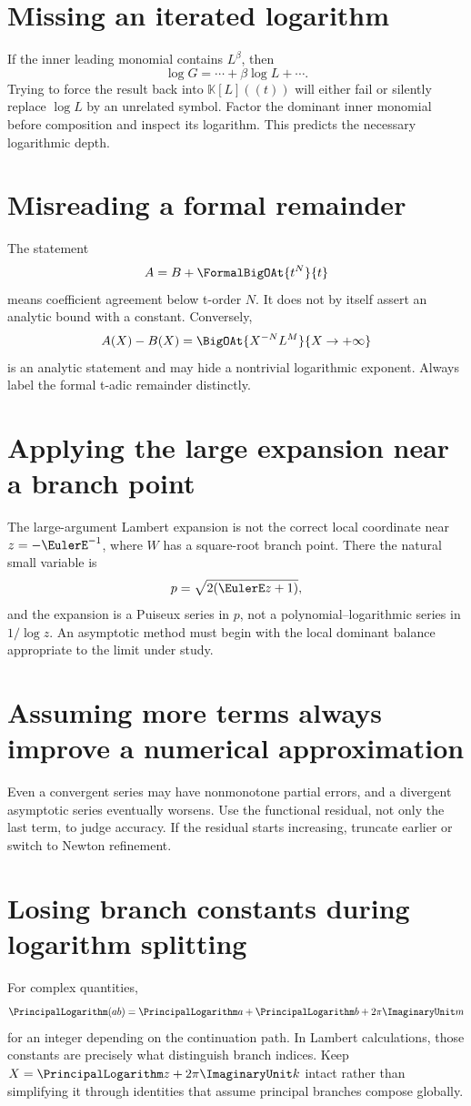 \documentclass[11pt,openany]{book}
\theoremstyle{definition}
\theoremstyle{plain}
\theoremstyle{remark}
\newcommand{\K}{\mathbb{K}}
\begin{document}
\section{Missing an iterated logarithm}
If the inner leading monomial contains \(L^\beta\), then
\[
 \log G=\cdots+\beta\log L+\cdots.
\]
Trying to force the result back into \(\K[L]((t))\) will either fail or silently
replace \(\log L\) by an unrelated symbol.  Factor the dominant inner monomial
before composition and inspect its logarithm.  This predicts the necessary
logarithmic depth.

\section{Misreading a formal remainder}
The statement
\[
 A=B+\FormalBigOAt{t^N}{t}
\]
means coefficient agreement below t-order \(N\).  It does not by itself assert
an analytic bound with a constant.  Conversely,
\[
 A(X)-B(X)=\BigOAt{X^{-N}L^M}{X\to+\infty}
\]
is an analytic statement and may hide a nontrivial logarithmic exponent.
Always label the formal t-adic remainder distinctly.

\section{Applying the large expansion near a branch point}
The large-argument Lambert expansion is not the correct local coordinate near
\(z=-\EulerE^{-1}\), where \(W\) has a square-root branch point.  There the natural
small variable is
\[
 p=\sqrt{2(\EulerE z+1)},
\]
and the expansion is a Puiseux series in \(p\), not a polynomial--logarithmic
series in \(1/\log z\).  An asymptotic method must begin with the local dominant
balance appropriate to the limit under study.

\section{Assuming more terms always improve a numerical approximation}
Even a convergent series may have nonmonotone partial errors, and a divergent
asymptotic series eventually worsens.  Use the functional residual, not only
the last term, to judge accuracy.  If the residual starts increasing, truncate
earlier or switch to Newton refinement.

\section{Losing branch constants during logarithm splitting}
For complex quantities,
\[
 \PrincipalLogarithm(ab)=\PrincipalLogarithm a+\PrincipalLogarithm b+2\pi\ImaginaryUnit m
\]
for an integer depending on the continuation path.  In Lambert calculations,
those constants are precisely what distinguish branch indices.  Keep
\(X=\PrincipalLogarithm z+2\pi\ImaginaryUnit k\) intact rather than simplifying it through identities
that assume principal branches compose globally.
\end{document}

